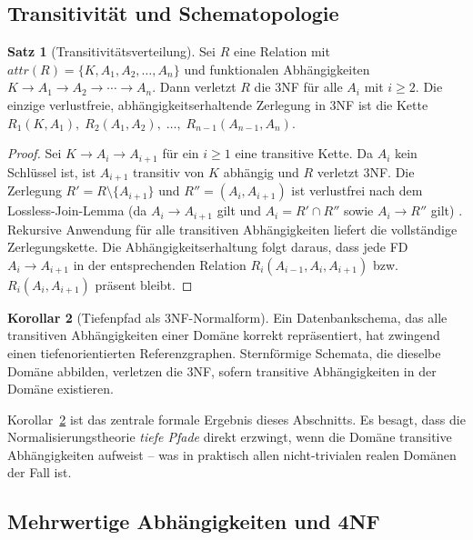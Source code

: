 ﻿\documentclass[a4paper,12pt]{report}
\theoremstyle{definition}
\newtheorem{theorem}{Satz}[chapter]
\newtheorem{corollary}[theorem]{Korollar}
\theoremstyle{remark}
\newcommand{\att}{\mathit{attr}}
\begin{document}
\subsection{Transitivität und Schematopologie}

\begin{theorem}[Transitivitätsverteilung]
\label{thm:transitivitaet}
Sei $R$ eine Relation mit $\att(R) = \{K, A_1, A_2, \ldots, A_n\}$ und
funktionalen Abhängigkeiten $K \to A_1 \to A_2 \to \cdots \to A_n$.
Dann verletzt $R$ die 3NF für alle $A_i$ mit $i \geq 2$.
Die einzige verlustfreie, abhängigkeitserhaltende Zerlegung in 3NF ist
die Kette $R_1(K, A_1),\; R_2(A_1, A_2),\; \ldots,\; R_{n-1}(A_{n-1}, A_n)$.
\end{theorem}

\begin{proof}
Sei $K \to A_i \to A_{i+1}$ für ein $i \geq 1$ eine transitive Kette.
Da $A_i$ kein Schlüssel ist, ist $A_{i+1}$ transitiv von $K$ abhängig und
$R$ verletzt 3NF. Die Zerlegung $R' = R \setminus \{A_{i+1}\}$ und
$R'' = (A_i, A_{i+1})$ ist verlustfrei nach dem Lossless-Join-Lemma
(da $A_i \to A_{i+1}$ gilt und $A_i = R' \cap R''$ sowie $A_i \to R''$ gilt)
\cite{Ullman1988}. Rekursive Anwendung für alle transitiven Abhängigkeiten
liefert die vollständige Zerlegungskette. Die Abhängigkeitserhaltung folgt
daraus, dass jede FD $A_i \to A_{i+1}$ in der entsprechenden Relation
$R_i(A_{i-1}, A_i, A_{i+1})$ bzw.\ $R_i(A_i, A_{i+1})$ präsent bleibt.
\end{proof}

\begin{corollary}[Tiefenpfad als 3NF-Normalform]
\label{cor:tiefenpfad3NF}
Ein Datenbankschema, das alle transitiven Abhängigkeiten einer Domäne
korrekt repräsentiert, hat zwingend einen tiefenorientierten Referenzgraphen.
Sternförmige Schemata, die dieselbe Domäne abbilden, verletzen die 3NF,
sofern transitive Abhängigkeiten in der Domäne existieren.
\end{corollary}

Korollar~\ref{cor:tiefenpfad3NF} ist das zentrale formale Ergebnis dieses
Abschnitts. Es besagt, dass die Normalisierungstheorie \emph{tiefe Pfade}
direkt erzwingt, wenn die Domäne transitive Abhängigkeiten aufweist --
was in praktisch allen nicht-trivialen realen Domänen der Fall ist.

\subsection{Mehrwertige Abhängigkeiten und 4NF}
\end{document}
